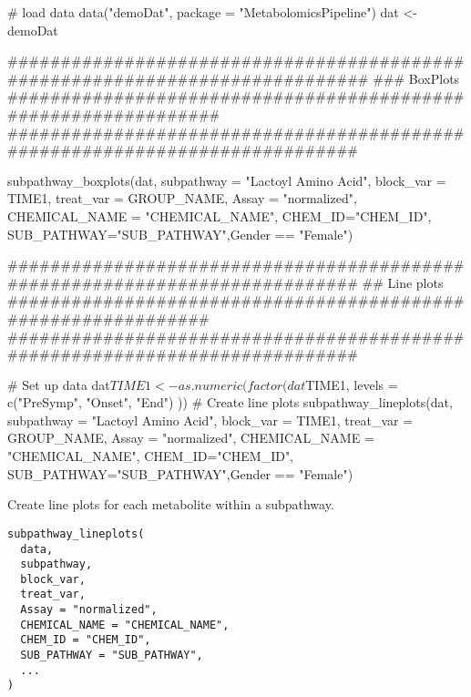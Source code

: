 \documentclass[a4paper]{book}
\begin{document}
\begin{Examples}
\begin{ExampleCode}
# load data
data("demoDat", package = "MetabolomicsPipeline")
dat <- demoDat

#############################################################################
### BoxPlots ###############################################################
############################################################################

subpathway_boxplots(dat,
                 subpathway = "Lactoyl Amino Acid", block_var = TIME1,
                 treat_var = GROUP_NAME, Assay = "normalized",
                 CHEMICAL_NAME = "CHEMICAL_NAME",
                 CHEM_ID="CHEM_ID",
                 SUB_PATHWAY="SUB_PATHWAY",Gender == "Female")


############################################################################
## Line plots ##############################################################
############################################################################

# Set up data
dat$TIME1 <- as.numeric(factor(dat$TIME1,
    levels = c("PreSymp", "Onset", "End")
))
# Create line plots
subpathway_lineplots(dat,
                    subpathway = "Lactoyl Amino Acid",
                    block_var = TIME1, treat_var = GROUP_NAME,
                    Assay = "normalized",
                    CHEMICAL_NAME = "CHEMICAL_NAME",
                    CHEM_ID="CHEM_ID",
                    SUB_PATHWAY="SUB_PATHWAY",Gender == "Female")



\end{ExampleCode}
\end{Examples}
%
\begin{Description}
Create line plots for each metabolite within a subpathway.
\end{Description}
%
\begin{Usage}
\begin{verbatim}
subpathway_lineplots(
  data,
  subpathway,
  block_var,
  treat_var,
  Assay = "normalized",
  CHEMICAL_NAME = "CHEMICAL_NAME",
  CHEM_ID = "CHEM_ID",
  SUB_PATHWAY = "SUB_PATHWAY",
  ...
)
\end{verbatim}
\end{Usage}
%
\end{document}
